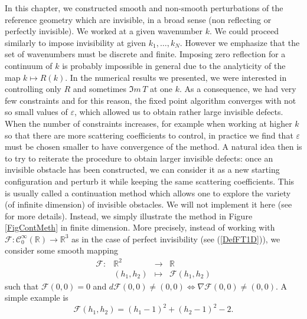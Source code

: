 \documentclass[11pt,a4paper]{report}
\newcommand{\eps}{\varepsilon}
\newcommand{\R}{\mathbb{R}}
\begin{document}
 
In this chapter, we constructed smooth and non-smooth perturbations of the reference geometry which are invisible, in a broad sense (non reflecting or perfectly invisible). We worked at a given wavenumber $k$. We could proceed similarly to impose invisibility at given $k_1,\dots,k_N$. However we emphasize that the set of wavenumbers must be discrete and finite. Imposing zero reflection for a continuum of $k$ is probably impossible in general due to the analyticity of the map $k\mapsto R(k)$.
In the numerical results we presented, we were interested in controlling only $R$ and sometimes $\Im m\,T$ at one $k$. As a consequence, we had very few constraints and for this reason, the fixed point algorithm converges with not so small values of $\eps$, which allowed us to obtain rather large invisible defects. When the number of constraints increases, for example when working at higher $k$ so that there are more scattering coefficients to control, in practice we find that $\eps$ must be chosen smaller to have convergence of the method. A natural idea then is to try to reiterate the procedure to obtain larger invisible defects: once an invisible obstacle has been constructed, we can consider it as a new starting configuration and perturb it while keeping the same scattering coefficients. This is usually called a continuation method which allows one to explore the variety (of infinite dimension) of invisible obstacles. We will not implement it here (see \cite{BeBC21} for more details). Instead, we simply illustrate the method in Figure \ref{FigContMeth} in finite dimension. More precisely, instead of working with $\mathscr{F}:\mathscr{C}^{\infty}_0(\R)\to\R^3$ as in the case of perfect invisibility (see (\ref{DefFT1D})), we consider some smooth mapping
\[
\begin{array}{rcll}
\mathscr{F}:&\R^2&\to&\R \\[2pt]
 &  (h_1,h_2) &\mapsto& \mathscr{F}(h_1,h_2)
\end{array}
\]
such that $\mathscr{F}(0,0)=0$ and $d\mathscr{F}(0,0)\ne(0,0)\Leftrightarrow\nabla\mathscr{F}(0,0)\ne(0,0)$. A simple example is 
\[
\mathscr{F}(h_1,h_2)=(h_1-1)^2+(h_2-1)^2-2.
\]
\end{document}
